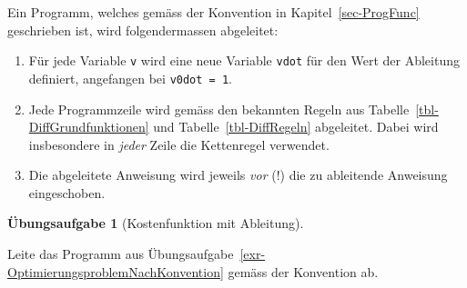 \documentclass[
  a4paper,
  DIV=11]{scrreprt}
\providecommand{\tightlist}{%
  \setlength{\itemsep}{0pt}\setlength{\parskip}{0pt}}\usepackage{longtable,booktabs,array}
\theoremstyle{definition}
\newtheorem{exercise}{Übungsaufgabe}[chapter]
\theoremstyle{definition}
\theoremstyle{remark}
\begin{document}
\begin{tcolorbox}[enhanced jigsaw, titlerule=0mm, title=\textcolor{quarto-callout-important-color}{\faExclamation}\hspace{0.5em}{Konvention}, breakable, coltitle=black, leftrule=.75mm, bottomrule=.15mm, colback=white, rightrule=.15mm, opacitybacktitle=0.6, bottomtitle=1mm, toptitle=1mm, left=2mm, toprule=.15mm, colbacktitle=quarto-callout-important-color!10!white, colframe=quarto-callout-important-color-frame, arc=.35mm, opacityback=0]

Ein Programm, welches gemäss der Konvention in
Kapitel~\ref{sec-ProgFunc} geschrieben ist, wird folgendermassen
abgeleitet:

\begin{enumerate}
\def\labelenumi{\arabic{enumi}.}
\tightlist
\item
  Für jede Variable \texttt{v} wird eine neue Variable \texttt{vdot} für
  den Wert der Ableitung definiert, angefangen bei \texttt{v0dot\ =\ 1}.
\item
  Jede Programmzeile wird gemäss den bekannten Regeln aus
  Tabelle~\ref{tbl-DiffGrundfunktionen} und Tabelle~\ref{tbl-DiffRegeln}
  abgeleitet. Dabei wird insbesondere in \emph{jeder} Zeile die
  Kettenregel verwendet.
\item
  Die abgeleitete Anweisung wird jeweils \emph{vor} (!) die zu
  ableitende Anweisung eingeschoben.
\end{enumerate}

\end{tcolorbox}

\begin{exercise}[Kostenfunktion mit
Ableitung]\protect\hypertarget{exr-SADKostenfunktionManuell}{}\label{exr-SADKostenfunktionManuell}

Leite das Programm aus
Übungsaufgabe~\ref{exr-OptimierungsproblemNachKonvention} gemäss der
Konvention ab.

\end{exercise}
\end{document}
